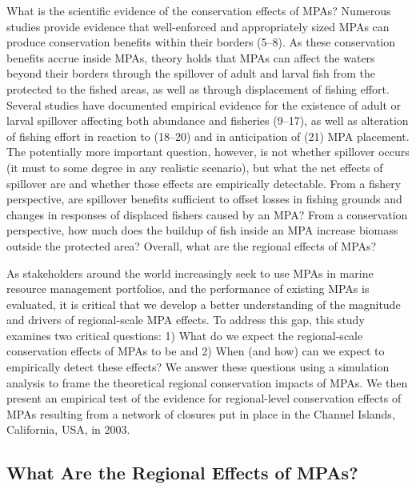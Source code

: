\documentclass[9pt,twocolumn,twoside,lineno]{pnas-new}
\begin{document}
What is the scientific evidence of the conservation effects of MPAs?
Numerous studies provide evidence that well-enforced and appropriately
sized MPAs can produce conservation benefits within their borders
(5--8). As these conservation benefits accrue inside MPAs, theory holds
that MPAs can affect the waters beyond their borders through the
spillover of adult and larval fish from the protected to the fished
areas, as well as through displacement of fishing effort. Several
studies have documented empirical evidence for the existence of adult or
larval spillover affecting both abundance and fisheries (9--17), as well
as alteration of fishing effort in reaction to (18--20) and in
anticipation of (21) MPA placement. The potentially more important
question, however, is not whether spillover occurs (it must to some
degree in any realistic scenario), but what the net effects of spillover
are and whether those effects are empirically detectable. From a fishery
perspective, are spillover benefits sufficient to offset losses in
fishing grounds and changes in responses of displaced fishers caused by
an MPA? From a conservation perspective, how much does the buildup of
fish inside an MPA increase biomass outside the protected area? Overall,
what are the regional effects of MPAs?

As stakeholders around the world increasingly seek to use MPAs in marine
resource management portfolios, and the performance of existing MPAs is
evaluated, it is critical that we develop a better understanding of the
magnitude and drivers of regional-scale MPA effects. To address this
gap, this study examines two critical questions: 1) What do we expect
the regional-scale conservation effects of MPAs to be and 2) When (and
how) can we expect to empirically detect these effects? We answer these
questions using a simulation analysis to frame the theoretical regional
conservation impacts of MPAs. We then present an empirical test of the
evidence for regional-level conservation effects of MPAs resulting from
a network of closures put in place in the Channel Islands, California,
USA, in 2003.

\hypertarget{what-are-the-regional-effects-of-mpas}{%
\subsection*{What Are the Regional Effects of
MPAs?}\label{what-are-the-regional-effects-of-mpas}}
\end{document}
